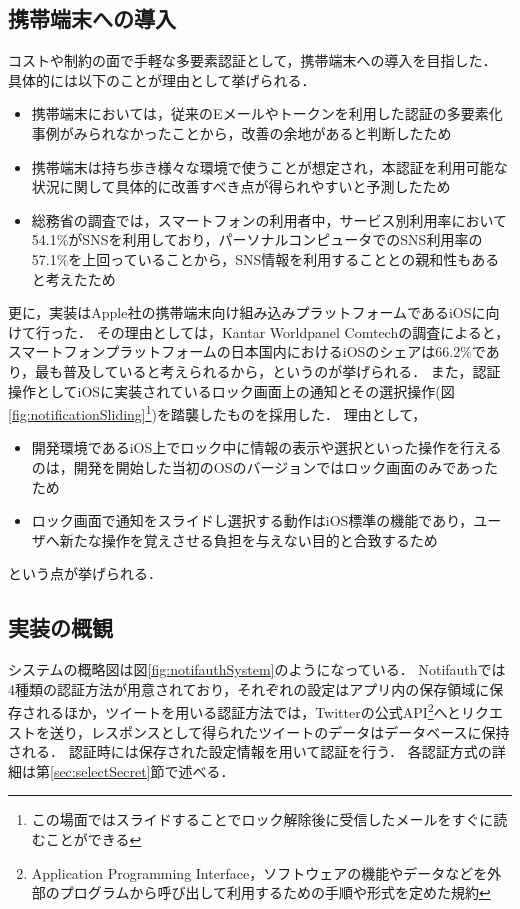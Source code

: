 \subsection{携帯端末への導入}\label{subsec:forMobile}
コストや制約の面で手軽な多要素認証として，携帯端末への導入を目指した．
具体的には以下のことが理由として挙げられる．
\begin{itemize}
  \item 携帯端末においては，従来のEメールやトークンを利用した認証の多要素化事例がみられなかったことから，改善の余地があると判断したため
  \item 携帯端末は持ち歩き様々な環境で使うことが想定され，本認証を利用可能な状況に関して具体的に改善すべき点が得られやすいと予測したため
  \item 総務省の調査\cite{micwhitepaper24}では，スマートフォンの利用者中，サービス別利用率において54.1\%がSNSを利用しており，パーソナルコンピュータでのSNS利用率の57.1\%を上回っていることから，SNS情報を利用することとの親和性もあると考えたため
\end{itemize}

更に，実装はApple社の携帯端末向け組み込みプラットフォームであるiOSに向けて行った．
その理由としては，Kantar Worldpanel Comtechの調査\cite{kantarWorldPanelSmartphoneOS}によると，スマートフォンプラットフォームの日本国内におけるiOSのシェアは66.2\%であり，最も普及していると考えられるから，というのが挙げられる．
また，認証操作としてiOSに実装されているロック画面上の通知とその選択操作(図\ref{fig:notificationSliding}\footnote{この場面ではスライドすることでロック解除後に受信したメールをすぐに読むことができる})を踏襲したものを採用した．
理由として，
\begin{itemize}
  \item 開発環境であるiOS上でロック中に情報の表示や選択といった操作を行えるのは，開発を開始した当初のOSのバージョンではロック画面のみであったため
  \item ロック画面で通知をスライドし選択する動作はiOS標準の機能であり，ユーザへ新たな操作を覚えさせる負担を与えない目的と合致するため
\end{itemize}
という点が挙げられる．

\subsection{実装の概観}
システムの概略図は図\ref{fig:notifauthSystem}のようになっている．
Notifauthでは4種類の認証方法が用意されており，それぞれの設定はアプリ内の保存領域に保存されるほか，ツイートを用いる認証方法では，Twitterの公式API\footnote{Application Programming Interface，ソフトウェアの機能やデータなどを外部のプログラムから呼び出して利用するための手順や形式を定めた規約}へとリクエストを送り，レスポンスとして得られたツイートのデータはデータベースに保持される．
認証時には保存された設定情報を用いて認証を行う．
各認証方式の詳細は第\ref{sec:selectSecret}節で述べる．


